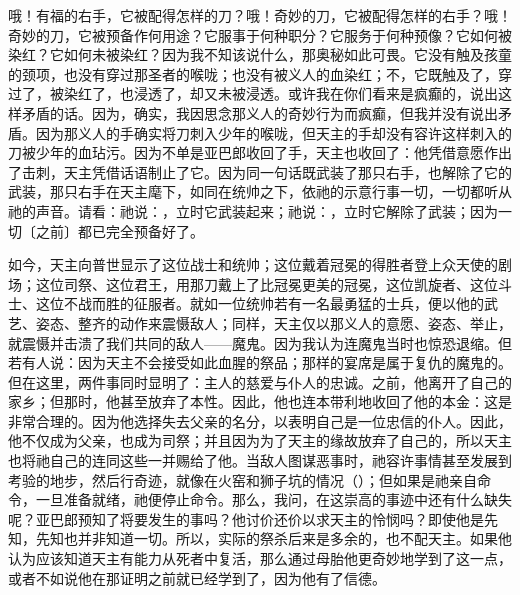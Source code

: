哦！有福的右手，它被配得怎样的刀？哦！奇妙的刀，它被配得怎样的右手？哦！奇妙的刀，它被预备作何用途？它服事于何种职分？它服务于何种预像？它如何被染红？它如何未被染红？因为我不知该说什么，那奥秘如此可畏。它没有触及孩童的颈项，也没有穿过那圣者的喉咙；也没有被义人的血染红；不，它既触及了，穿过了，被染红了，也浸透了，却又未被浸透。或许我在你们看来是疯癫的，说出这样矛盾的话。因为，确实，我因思念那义人的奇妙行为而疯癫，但我并没有说出矛盾。因为那义人的手确实将刀刺入少年的喉咙，但天主的手却没有容许这样刺入的刀被少年的血玷污。因为不单是亚巴郎收回了手，天主也收回了：他凭借意愿作出了击刺，天主凭借话语制止了它。因为同一句话既武装了那只右手，也解除了它的武装，那只右手在天主麾下，如同在统帅之下，依祂的示意行事一切，一切都听从祂的声音。请看：祂说：，立时它武装起来；祂说：，立时它解除了武装；因为一切〔之前〕都已完全预备好了。\par

如今，天主向普世显示了这位战士和统帅；这位戴着冠冕的得胜者登上众天使的剧场；这位司祭、这位君王，用那刀戴上了比冠冕更美的冠冕，这位凯旋者、这位斗士、这位不战而胜的征服者。就如一位统帅若有一名最勇猛的士兵，便以他的武艺、姿态、整齐的动作来震慑敌人；同样，天主仅以那义人的意愿、姿态、举止，就震慑并击溃了我们共同的敌人——魔鬼。因为我认为连魔鬼当时也惊恐退缩。但若有人说：因为天主不会接受如此血腥的祭品；那样的宴席是属于复仇的魔鬼的。但在这里，两件事同时显明了：主人的慈爱与仆人的忠诚。之前，他离开了自己的家乡；但那时，他甚至放弃了本性。因此，他也连本带利地收回了他的本金：这是非常合理的。因为他选择失去父亲的名分，以表明自己是一位忠信的仆人。因此，他不仅成为父亲，也成为司祭；并且因为为了天主的缘故放弃了自己的，所以天主也将祂自己的连同这些一并赐给了他。当敌人图谋恶事时，祂容许事情甚至发展到考验的地步，然后行奇迹，就像在火窑和狮子坑的情况（）；但如果是祂亲自命令，一旦准备就绪，祂便停止命令。那么，我问，在这崇高的事迹中还有什么缺失呢？亚巴郎预知了将要发生的事吗？他讨价还价以求天主的怜悯吗？即使他是先知，先知也并非知道一切。所以，实际的祭杀后来是多余的，也不配天主。如果他认为应该知道天主有能力从死者中复活，那么通过母胎他更奇妙地学到了这一点，或者不如说他在那证明之前就已经学到了，因为他有了信德。\par

